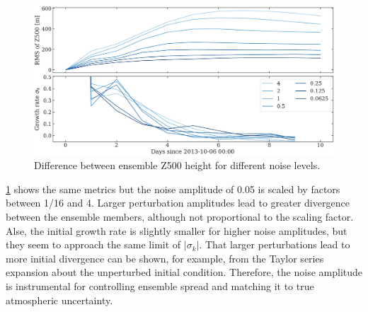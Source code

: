 \documentclass[parskip=half,DIV=12,bookmarkpackage=false]{scrartcl}
\begin{document}
\newpage
\begin{figure}[h]
    \centering
    \includegraphics[width=\textwidth]{figures/all_factors.pdf}
    \caption{Difference between ensemble Z500 height for different noise levels.}
    \label{fig:fac-all}
\end{figure}

\cref{fig:fac-all} shows the same metrics but the noise amplitude of 0.05 is scaled by factors between 1/16 and 4. Larger perturbation amplitudes lead to greater divergence between the ensemble members, although not proportional to the scaling factor. Alse, the initial growth rate is slightly smaller for higher noise amplitudes, but they seem to approach the same limit of $|\sigma_k|$. That larger perturbations lead to more initial divergence can be shown, for example, from the Taylor series expansion about the unperturbed initial condition. Therefore, the noise amplitude is instrumental for controlling ensemble spread and matching it to true atmospheric uncertainty.
\end{document}
